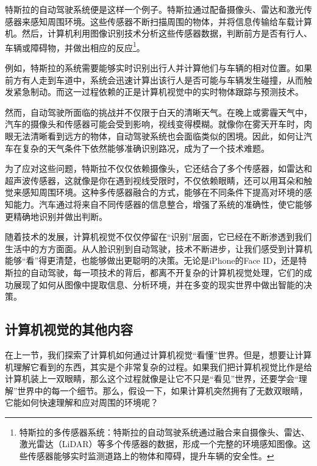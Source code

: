 特斯拉的自动驾驶系统便是这样一个例子。特斯拉通过配备摄像头、雷达和激光传感器来感知周围环境。这些传感器不断扫描周围的物体，并将信息传输给车载计算机。然后，计算机利用图像识别技术分析这些传感器数据，判断前方是否有行人、车辆或障碍物，并做出相应的反应\footnote{特斯拉的多传感器系统：特斯拉的自动驾驶系统通过融合来自摄像头、雷达、激光雷达（LiDAR）等多个传感器的数据，形成一个完整的环境感知图像。这些传感器能够实时监测道路上的物体和障碍，提升车辆的安全性。}。

例如，特斯拉的系统需要能够实时识别出行人并计算他们与车辆的相对位置。如果前方有人走到车道中，系统会迅速计算出该行人是否可能与车辆发生碰撞，从而触发紧急制动。而这一过程依赖的正是计算机视觉中的实时物体跟踪与预测技术。

然而，自动驾驶所面临的挑战并不仅限于白天的清晰天气。在晚上或雾霾天气中，汽车的摄像头和传感器可能会受到影响，视线变得模糊。就像你在雾天开车时，肉眼无法清晰看到远方的物体，自动驾驶系统也会面临类似的困境。因此，如何让汽车在复杂的天气条件下依然能够准确识别路况，成为了一个技术难题。

为了应对这些问题，特斯拉不仅仅依赖摄像头，它还结合了多个传感器，如雷达和超声波传感器，这就像是你在遇到视线受限时，不仅依赖眼睛，还可以用耳朵和触觉来感知周围环境。这种多传感器融合的方式，能够在不同条件下提高对环境的感知能力。汽车通过将来自不同传感器的信息整合，增强了系统的准确性，使它能够更精确地识别并做出判断。

随着技术的发展，计算机视觉不仅仅停留在“识别”层面，它已经在不断渗透到我们生活中的方方面面。从人脸识别到自动驾驶，技术不断进步，让我们感受到计算机能够“看”得更清楚，也能够做出更聪明的决策。无论是iPhone的Face ID，还是特斯拉的自动驾驶，每一项技术的背后，都离不开复杂的计算机视觉处理，它们的成功展现了如何从图像中提取信息、分析环境，并在多变的现实世界中做出智能的决策。
\subsection{计算机视觉的其他内容}

在上一节，我们探索了计算机如何通过计算机视觉“看懂”世界。但是，想要让计算机理解它看到的东西，其实是个非常复杂的过程。如果我们把计算机视觉比作是给计算机装上一双眼睛，那么这个过程就像是让它不只是“看见”世界，还要学会“理解”世界中的每一个细节。那么，假设一下，如果计算机突然拥有了无数双眼睛，它能如何快速理解和应对周围的环境呢？

